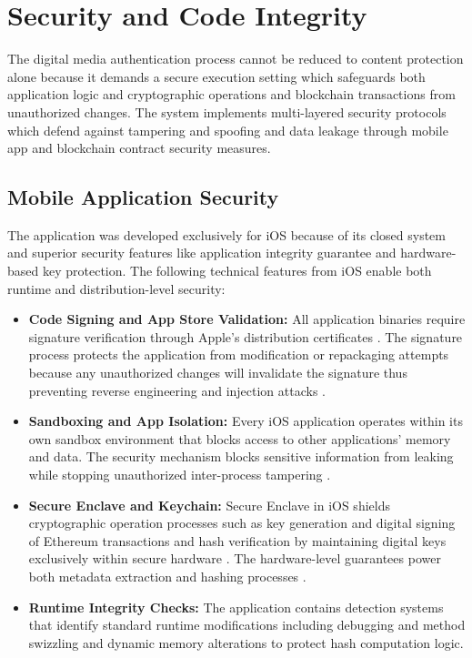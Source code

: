 \section{Security and Code Integrity}
The digital media authentication process cannot be reduced to content protection alone because it demands a secure execution setting which safeguards both application logic and cryptographic operations and blockchain transactions from unauthorized changes. 
The system implements multi-layered security protocols which defend against tampering and spoofing and data leakage through mobile app and blockchain contract security measures.

\subsection{Mobile Application Security}
The application was developed exclusively for iOS because of its closed system and superior security features like application integrity guarantee and hardware-based key protection. 
The following technical features from iOS enable both runtime and distribution-level security:

\begin{itemize}
    \item {\textbf{Code Signing and App Store Validation: }} All application binaries require signature verification through Apple’s distribution certificates \cite{devCert}. 
    The signature process protects the application from modification or repackaging attempts because any unauthorized changes will invalidate the signature thus preventing reverse engineering and injection attacks \cite{iosSecGarg} \cite{benenson2013}.
    \item {\textbf{Sandboxing and App Isolation: }} Every iOS application operates within its own sandbox environment that blocks access to other applications' memory and data. The security mechanism blocks sensitive information from leaking while stopping unauthorized inter-process tampering \cite{iosSecGarg}.
    \item {\textbf{Secure Enclave and Keychain: }} Secure Enclave in iOS shields cryptographic operation processes such as key generation and digital signing of Ethereum transactions and hash verification by maintaining digital keys exclusively within secure hardware \cite{SecureEnclave2024}. The hardware-level guarantees power both metadata extraction and hashing processes \cite{benenson2013}.
    \item {\textbf{Runtime Integrity Checks: }} The application contains detection systems that identify standard runtime modifications including debugging and method swizzling and dynamic memory alterations to protect hash computation logic.
\end{itemize}

